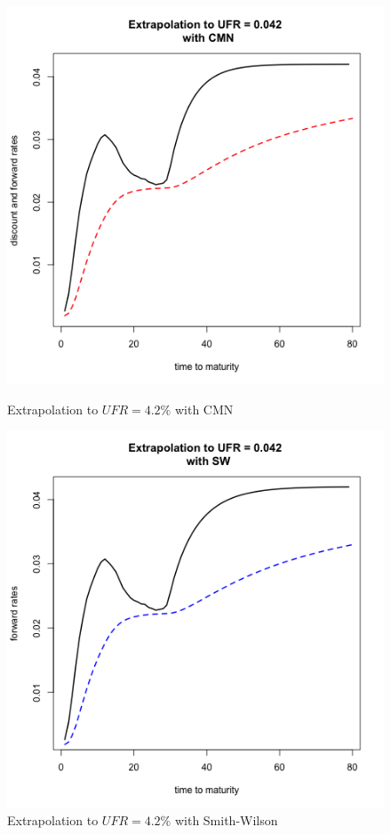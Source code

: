 \begin{figure}[!htb]
    \centering
    \begin{minipage}{.5\textwidth}
        \centering
        \includegraphics[width=1.065\linewidth, height=0.4\textheight]{gfx/chapter-yc-insurance/construction_graph18}
        \caption{Extrapolation to $UFR = 4.2\%$ with CMN}
        \label{fig:extrapCMNSII1}
    \end{minipage}%
    \begin{minipage}{0.5\textwidth}
        \centering
        \includegraphics[width=1.065\linewidth, height=0.4\textheight]{gfx/chapter-yc-insurance/construction_graph19}
        \caption{Extrapolation to $UFR = 4.2\%$ with Smith-Wilson}
        \label{fig:extrapSWSII1}
    \end{minipage}
  \end{figure}

